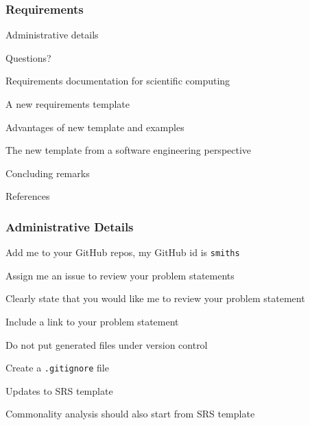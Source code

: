 \documentclass[t,12pt,numbers,fleqn]{beamer}
\begin{document}



\begin{frame}
\frametitle{Requirements}

\bi
\item Administrative details
\item Questions?
\item Requirements documentation for scientific computing
\item A new requirements template
\item Advantages of new template and examples
\item The new template from a software engineering perspective
\item Concluding remarks
\item References
\ei
\end{frame}


\begin{frame}
\frametitle{Administrative Details}

\bi
\item Add me to your GitHub repos, my GitHub id is \texttt{smiths}
\item Assign me an issue to review your problem statements
\bi
\item Clearly state that you would like me to review your problem statement
\item Include a link to your problem statement
\ei
\item Do not put generated files under version control
\item Create a \texttt{.gitignore} file
\item Updates to SRS template
\item Commonality analysis should also start from SRS template
\ei

\end{frame}

\end{document}

